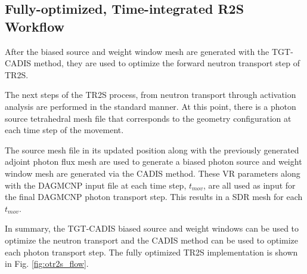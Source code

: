 \subsection{Fully-optimized, Time-integrated R2S Workflow}
After the biased source and weight window mesh are generated with the TGT-CADIS
method, they are used to optimize the forward neutron transport step of TR2S.

The next steps of the TR2S process, from neutron transport through activation
analysis are performed in the standard manner.  At this point, there is a
photon source tetrahedral mesh file that corresponds to the 
geometry configuration at each time step of the movement.

The source mesh file in its updated position along with the previously
generated adjoint photon flux mesh are used to generate a biased photon source 
and weight window mesh are generated via the CADIS method. 
These VR parameters along with the DAGMCNP input file %
at each time step,
$t_{mov}$, are all used 
as input for the final DAGMCNP photon transport step.  This results in
a SDR mesh for each $t_{mov}$.  

In summary, the TGT-CADIS biased source and weight windows can be used to optimize the 
neutron transport and the CADIS method can be used to optimize each photon
transport step.  The fully optimized TR2S implementation is shown in Fig.
\ref{fig:otr2s_flow}.

 

